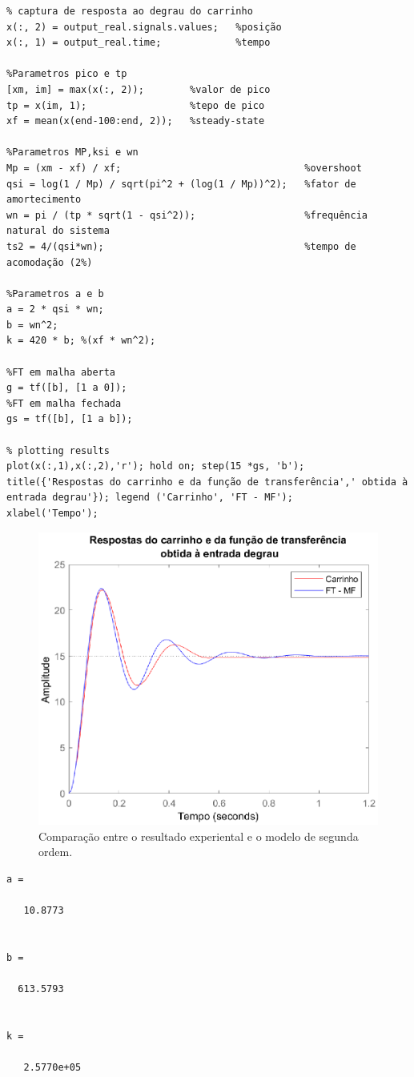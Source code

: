 \documentclass{article}
\begin{document}
\begin{lstlisting}
% captura de resposta ao degrau do carrinho
x(:, 2) = output_real.signals.values;   %posição
x(:, 1) = output_real.time;             %tempo

%Parametros pico e tp
[xm, im] = max(x(:, 2));        %valor de pico
tp = x(im, 1);                  %tepo de pico
xf = mean(x(end-100:end, 2));   %steady-state

%Parametros MP,ksi e wn
Mp = (xm - xf) / xf;                                %overshoot
qsi = log(1 / Mp) / sqrt(pi^2 + (log(1 / Mp))^2);   %fator de amortecimento
wn = pi / (tp * sqrt(1 - qsi^2));                   %frequência natural do sistema
ts2 = 4/(qsi*wn);                                   %tempo de acomodação (2%)

%Parametros a e b
a = 2 * qsi * wn;
b = wn^2;
k = 420 * b; %(xf * wn^2);

%FT em malha aberta
g = tf([b], [1 a 0]);
%FT em malha fechada
gs = tf([b], [1 a b]);

% plotting results
plot(x(:,1),x(:,2),'r'); hold on; step(15 *gs, 'b');
title({'Respostas do carrinho e da função de transferência',' obtida à entrada degrau'}); legend ('Carrinho', 'FT - MF');
xlabel('Tempo');
\end{lstlisting}

\begin{figure}[H]
    \centering
        \includegraphics[width=.8\linewidth]{images/Matlab/identifica_01.eps}
        \caption{Comparação entre o resultado experiental e o modelo de segunda ordem.}\label{fig:resposta_modelo}
\end{figure}

        \color{gray}{0.5} \begin{verbatim}
a =

   10.8773


b =

  613.5793


k =

   2.5770e+05

\end{verbatim} \color{black}
\end{document}
